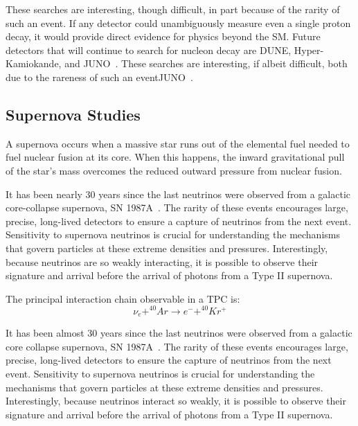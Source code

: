 These searches are interesting, though difficult, in part because of the rarity of such an event.
If any detector could unambiguously measure even a single proton decay, it would provide direct evidence for physics beyond the SM.
Future detectors that will continue to search for nucleon decay are DUNE, Hyper-Kamiokande, and JUNO~\citep{DUNE_TDR_V1_Abi_2020, https://doi.org/10.48550/arxiv.1805.04163, Juno:2022103927}.
These searches are interesting, if albeit difficult, both due to the rareness of such an eventJUNO~\citep{DUNE_TDR_V1_Abi_2020, https://doi.org/10.48550/arxiv.1805.04163, Juno:2022103927}.

\subsection{Supernova Studies}
\label{sec:intro_supernova}
A supernova occurs when a massive star runs out of the elemental fuel needed to fuel nuclear fusion at its core.
When this happens, the inward gravitational pull of the star's mass overcomes the reduced outward pressure from nuclear fusion.

It has been nearly 30 years since the last neutrinos were observed from a galactic core-collapse supernova, SN 1987A~\citep{1987ApJ...322..795F}.
The rarity of these events encourages large, precise, long-lived detectors to ensure a capture of neutrinos from the next event.
Sensitivity to supernova neutrinos is crucial for understanding the mechanisms that govern particles at these extreme densities and pressures.
Interestingly, because neutrinos are so weakly interacting, it is possible to observe their signature and arrival before the arrival of photons from a Type II supernova.


The principal interaction chain observable in a TPC is:
\begin{equation}
    \nu_{e} + ^{40}Ar \rightarrow e^- + ^{40}Kr^{+}
\end{equation}

It has been almost 30 years since the last neutrinos were observed from a galactic core collapse supernova, SN 1987A~\citep{1987ApJ...322..795F}.
The rarity of these events encourages large, precise, long-lived detectors to ensure the capture of neutrinos from the next event.
Sensitivity to supernova neutrinos is crucial for understanding the mechanisms that govern particles at these extreme densities and pressures.
Interestingly, because neutrinos interact so weakly, it is possible to observe their signature and arrival before the arrival of photons from a Type II supernova.

